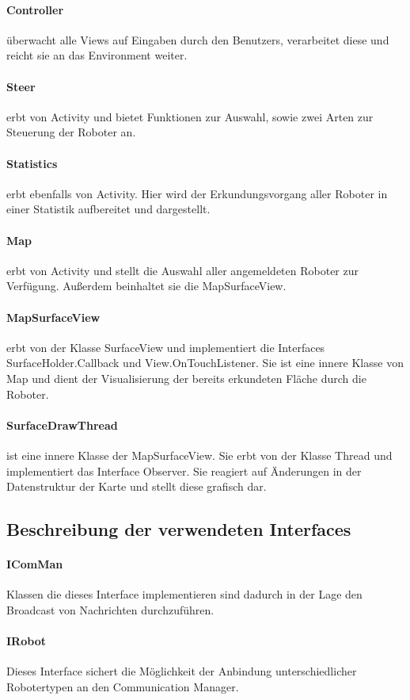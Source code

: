 \documentclass[10pt,a4paper]{article}
\begin{document}
			\paragraph*{Controller}
			überwacht alle Views auf Eingaben durch den Benutzers, verarbeitet diese und reicht sie an das Environment weiter.
			\paragraph*{Steer}
			erbt von Activity und bietet Funktionen zur Auswahl, sowie zwei Arten zur Steuerung der Roboter an.
			\paragraph*{Statistics}
			erbt ebenfalls von Activity. Hier wird der Erkundungsvorgang aller Roboter in einer Statistik aufbereitet und dargestellt.
			\paragraph*{Map}
			erbt von Activity und stellt die Auswahl aller angemeldeten Roboter zur Verfügung. Außerdem beinhaltet sie die MapSurfaceView.
			\paragraph*{MapSurfaceView}
			erbt von der Klasse SurfaceView und implementiert die Interfaces SurfaceHolder.Callback und View.OnTouchListener.
			Sie ist eine innere Klasse von Map und dient der Visualisierung der bereits erkundeten Fläche durch die Roboter.
			\paragraph*{SurfaceDrawThread}
			ist eine innere Klasse der MapSurfaceView. Sie erbt von der Klasse Thread und implementiert das Interface Observer. 
			Sie reagiert auf Änderungen in der Datenstruktur der Karte und stellt diese grafisch dar.
			\subsection{Beschreibung der verwendeten Interfaces}
			\paragraph*{IComMan}
			Klassen die dieses Interface implementieren sind dadurch in der Lage den Broadcast von Nachrichten durchzuführen.
			\paragraph*{IRobot}
			Dieses Interface sichert die Möglichkeit der Anbindung unterschiedlicher Robotertypen an den Communication Manager.
\end{document}
